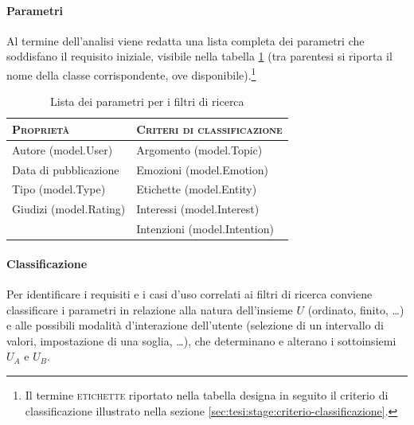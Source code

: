 \paragraph{Parametri}
Al termine dell'analisi viene redatta una lista completa dei parametri che soddisfano il requisito iniziale, visibile nella tabella \ref{tab:tesi:stage:parametri-filtri} (tra parentesi si riporta il nome della classe corrispondente, ove disponibile).\footnote{Il termine \textsc{etichette} riportato nella tabella designa in seguito il criterio di classificazione illustrato nella sezione \ref{sec:tesi:stage:criterio-classificazione}.}
\begin{table}[ht]
\centering
\begin{tabular}{|l|l|}
\hline
\textsc{Proprietà} & \textsc{Criteri di classificazione} \\ \hline
Autore (\textsf{model.User}) & Argomento (\textsf{model.Topic})\\
Data di pubblicazione & Emozioni (\textsf{model.Emotion}) \\
Tipo (\textsf{model.Type}) & Etichette (\textsf{model.Entity}) \\
Giudizi (\textsf{model.Rating}) & Interessi (\textsf{model.Interest}) \\
& Intenzioni (\textsf{model.Intention}) \\ \hline
\end{tabular}
\caption{Lista dei parametri per i filtri di ricerca}
\label{tab:tesi:stage:parametri-filtri}
\end{table}

\paragraph{Classificazione}
Per identificare i requisiti e i casi d'uso correlati ai filtri di ricerca conviene classificare i parametri in relazione alla natura dell'insieme $U$ (ordinato, finito, \ldots) e alle possibili modalità d'interazione dell'utente (selezione di un intervallo di valori, impostazione di una soglia, \ldots), che determinano e alterano i sottoinsiemi $U_A$ e $U_B$.

